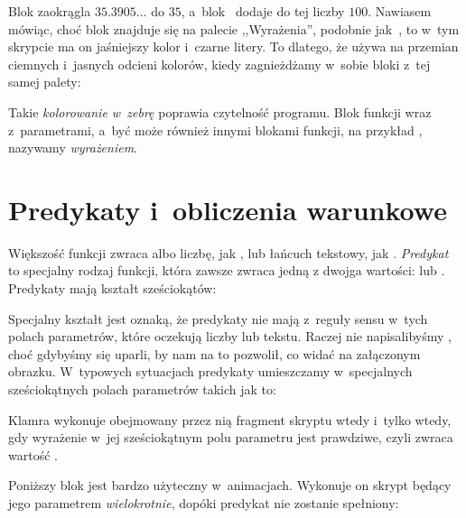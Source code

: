 \documentclass[a4paper]{report}
\begin{document}
Blok  zaokrągla $35.3905\ldots$ do $35$, a~blok~\code{+} dodaje do tej liczby $100$. Nawiasem mówiąc, choć blok  znajduje się na palecie ,,Wyrażenia'', podobnie jak~\code{+}, to w~tym skrypcie ma on jaśniejszy kolor i~czarne litery. To dlatego, że \Snap{} używa na przemian ciemnych i~jasnych odcieni kolorów, kiedy zagnieżdżamy w~sobie bloki z~tej samej palety:\nopagebreak


Takie \emph{kolorowanie w~zebrę} poprawia czytelność programu. Blok funkcji wraz z~parametrami, a~być może również innymi blokami funkcji, na przykład , nazywamy \emph{wyrażeniem}.

\section{Predykaty i~obliczenia warunkowe}

Większość funkcji zwraca albo liczbę, jak , lub łańcuch tekstowy, jak . \emph{Predykat} to specjalny rodzaj funkcji, która zawsze zwraca jedną z dwojga wartości:  lub . Predykaty mają kształt sześciokątów:\nopagebreak


\begin{sloppypar}
Specjalny kształt jest oznaką, że predykaty nie mają z~reguły sensu w~tych polach parametrów, które oczekują liczby lub tekstu. Raczej nie napisalibyśmy , choć gdybyśmy się uparli, \Snap{} by nam na to pozwolił, co widać na załączonym obrazku. W~typowych sytuacjach predykaty umieszczamy w~specjalnych sześciokątnych polach parametrów takich jak to:\nopagebreak
\end{sloppypar}


Klamra  wykonuje obejmowany przez nią fragment skryptu wtedy i~tylko wtedy, gdy wyrażenie w~jej sześciokątnym polu parametru jest prawdziwe, czyli zwraca wartość .\nopagebreak


Poniższy blok jest bardzo użyteczny w~animacjach. Wykonuje on skrypt będący jego parametrem \emph{wielokrotnie}, dopóki predykat nie zostanie spełniony:\nopagebreak
\end{document}
